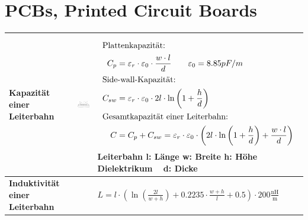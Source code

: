\section{PCBs, Printed Circuit Boards}

\begin{longtable}{|>{\bfseries}p{3cm}|c|p{11.2cm}|}
    \hline
    Kapazität \newline einer Leiterbahn
    & \includegraphics[width=4cm, valign=t]{pictures/PCBCapacity.png}
    & {\vspace{-1.8\topsep}
        \begin{align*}
            \intertext{Plattenkapazität:}
            C_p &= \varepsilon_{r}\cdot \varepsilon_{0}\cdot \frac{w\cdot l}{d} \qquad \varepsilon_{0}= 8.85 pF/m\\
            \intertext{Side-wall-Kapazität:}
            C_{sw} &= \varepsilon_{r}\cdot \varepsilon_{0}\cdot 2l \cdot \ln\left( 1 + \frac{h}{d}\right) \\
            \intertext{Gesamtkapazität einer Leiterbahn:}
            C &= C_p + C_{sw} = \varepsilon_{r}\cdot \varepsilon_{0}\cdot \left( 2l \cdot \ln\left( 1 + \frac{h}{d}\right) + \frac{w\cdot l}{d}\right) 
        \end{align*}
        \newline
        Leiterbahn \qquad l: Länge \qquad w: Breite \qquad h: Höhe\newline
        Dielektrikum $\;\;$ d: Dicke
    }
    \\ \hline
    Induktivität \newline einer Leiterbahn
    & 
    & {\newline
       $L = l \cdot\left( \ln\left( \frac{2l}{w + h}\right)  + 0.2235 \cdot \frac{w + h}{l} + 0.5\right)  \cdot 200\frac{\mathrm{nH}}{\mathrm{m}}$
       \newline 
      }
    \\ \hline
\end{longtable}